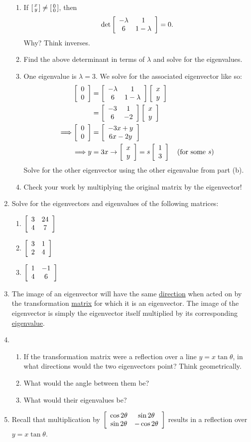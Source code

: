 \documentclass[../gatm.tex]{subfiles}
\begin{document}
\begin{enumerate}
\begin{enumerate}
\item If $\left[\begin{smallmatrix} x \\ y \end{smallmatrix}\right]\neq \left[\begin{smallmatrix} 0 \\ 0 \end{smallmatrix}\right]$, then $$\det \left[\begin{array}{cc} -\lambda & 1 \\ 6 & 1-\lambda \end{array}\right]=0.$$ Why? Think inverses.
\item Find the above determinant in terms of $\lambda$ and solve for the eigenvalues.
\item One eigenvalue is $\lambda=3$. We solve for the associated eigenvector like so:
\begin{align*}
\left[\begin{array}{c} 0 \\ 0 \end{array}\right] &= \left[\begin{array}{cc} -\lambda & 1 \\ 6 & 1-\lambda \end{array}\right]\left[\begin{array}{c} x \\ y \end{array}\right] \\
&= \left[\begin{array}{cc} -3 & 1 \\ 6 & -2 \end{array}\right]\left[\begin{array}{c} x \\ y \end{array}\right] \\
\Longrightarrow \left[\begin{array}{c} 0 \\ 0 \end{array}\right] &= \left[\begin{array}{c} -3x+y \\ 6x-2y \end{array}\right] \\
\Longrightarrow y&=3x \rightarrow \left[\begin{array}{c} x \\ y \end{array}\right]=s\left[\begin{array}{c} 1 \\ 3 \end{array}\right]\quad \text{(for some }s\text{)}
\end{align*}
Solve for the other eigenvector using the other eigenvalue from part (b).
\item Check your work by multiplying the original matrix by the eigenvector!
\end{enumerate}
\item Solve for the eigenvectors and eigenvalues of the following matrices:
\begin{multicols}{3}
\begin{enumerate}
\item $\left[\begin{array}{cc} 3 & 24 \\ 4 & 7 \end{array}\right]$
\item $\left[\begin{array}{cc} 3 & 1 \\ 2 & 4 \end{array}\right]$
\item $\left[\begin{array}{cc} 1 & -1 \\ 4 & 6 \end{array}\right]$
\end{enumerate}
\end{multicols}
\item The image of an eigenvector will have the same \underline{direction} when acted on by the transformation \underline{matrix} for which it is an eigenvector. The image of the eigenvector is simply the eigenvector itself multiplied by its corresponding \underline{eigenvalue}.
\item \begin{enumerate}
\item If the transformation matrix were a reflection over a line $y=x\tan\theta$, in what directions would the two eigenvectors point? Think geometrically.
\item What would the angle between them be?
\item What would their eigenvalues be?
\end{enumerate}
\item Recall that multiplication by $\left[\begin{array}{cc} \cos 2\theta & \sin 2\theta \\ \sin 2\theta & -\cos 2\theta \end{array}\right]$ results in a reflection over $y=x\tan \theta$.

\end{enumerate}
\end{document}
